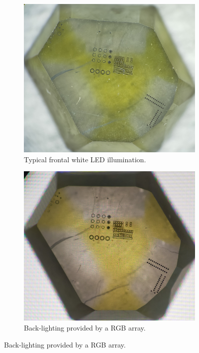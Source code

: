 \begin{refsection}
\begin{figure}[H]
\centering
\begin{subfigure}[t]{0.47\textwidth}
    \includegraphics[width=\textwidth]{Chapter7/Figs/Raster/optical front light.jpg}
    \caption{Typical frontal white LED illumination.}
    \label{fig:G_front}
\end{subfigure}
\hfill
\begin{subfigure}[t]{0.47\textwidth}
    \includegraphics[width=\textwidth]{Chapter7/Figs/Raster/optical back light.jpg}
    \caption{Back-lighting provided by a RGB array.}
    \label{fig:G_back}
\end{subfigure}


\end{figure}
\end{refsection}
